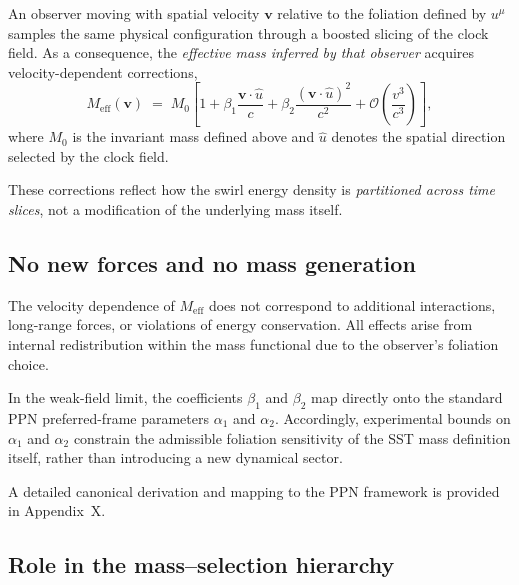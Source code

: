 \documentclass[10pt]{article}
\begin{document}
        An observer moving with spatial velocity $\mathbf{v}$ relative to the
        foliation defined by $u^\mu$ samples the same physical configuration
        through a boosted slicing of the clock field.
        As a consequence, the \emph{effective mass inferred by that observer}
        acquires velocity-dependent corrections,
        \begin{equation}
            M_{\mathrm{eff}}(\mathbf{v})
            \;=\;
            M_0
            \left[
                1
                + \beta_1 \frac{\mathbf{v}\!\cdot\!\hat{u}}{c}
                + \beta_2 \frac{(\mathbf{v}\!\cdot\!\hat{u})^2}{c^2}
                + \mathcal{O}\!\left(\frac{v^3}{c^3}\right)
            \right] ,
        \end{equation}
        where $M_0$ is the invariant mass defined above and $\hat{u}$ denotes
        the spatial direction selected by the clock field.

        These corrections reflect how the swirl energy density is
        \emph{partitioned across time slices}, not a modification of the
        underlying mass itself.

    \subsection{No new forces and no mass generation}

        The velocity dependence of $M_{\mathrm{eff}}$ does not correspond to
        additional interactions, long-range forces, or violations of energy
        conservation.
        All effects arise from internal redistribution within the mass
        functional due to the observer's foliation choice.

        In the weak-field limit, the coefficients $\beta_1$ and $\beta_2$
        map directly onto the standard PPN preferred-frame parameters
        $\alpha_1$ and $\alpha_2$.
        Accordingly, experimental bounds on $\alpha_1$ and $\alpha_2$
        constrain the admissible foliation sensitivity of the SST mass
        definition itself, rather than introducing a new dynamical sector.

        A detailed canonical derivation and mapping to the PPN framework
        is provided in Appendix~X.

    \subsection{Role in the mass--selection hierarchy}
\end{document}
